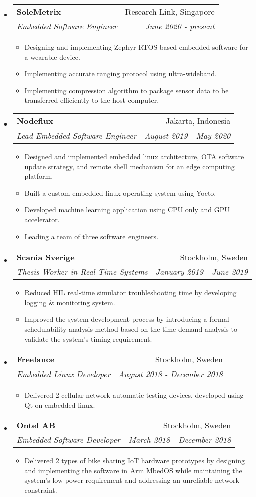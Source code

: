 \documentclass[letterpaper,9pt]{article}
\makeatletter
\newcommand{\resitem}[1]{\item #1 \vspace{-2pt}}
\newcommand{\ressubheading}[4]{
\begin{tabular*}{7.0in}{l@{\cftdotfill{\cftsecdotsep}\extracolsep{\fill}}r}
		\textbf{#1} & #2 \\
        \textit{#3} & \textit{#4} \\
\end{tabular*}\vspace{-6.3pt}}
\makeatother
\begin{document}
\begin{itemize}
  
  \item
        \ressubheading{SoleMetrix}{Research Link, Singapore}{Embedded Software Engineer}{June 2020 - present}
        \begin{itemize}
          \resitem{Designing and implementing Zephyr RTOS-based embedded software for a wearable device.}
          \resitem{Implementing accurate ranging protocol using ultra-wideband.}
          \resitem{Implementing compression algorithm to package sensor data to be transferred efficiently to the host computer.}
        \end{itemize}

  \item
        \ressubheading{Nodeflux}{Jakarta, Indonesia}{Lead Embedded Software Engineer}{August 2019 - May 2020}
        \begin{itemize}
          \resitem{Designed and implemented embedded linux architecture, OTA software update strategy, and remote shell mechanism for an edge computing platform.}
          \resitem{Built a custom embedded linux operating system using Yocto.}
          \resitem{Developed machine learning application using CPU only and GPU accelerator.}
          \resitem{Leading a team of three software engineers.}
        \end{itemize}

  \item
        \ressubheading{Scania Sverige}{Stockholm, Sweden}{Thesis Worker in Real-Time Systems}{January 2019 - June 2019}
        \begin{itemize}
          \resitem{Reduced HIL real-time simulator troubleshooting time by developing logging \& monitoring system.}
          \resitem{Improved the system development process by introducing a formal schedulability analysis method based on the time demand analysis to validate the system's timing requirement.}
        \end{itemize}

  \item
        \ressubheading{Freelance}{Stockholm, Sweden}{Embedded Linux Developer}{August 2018 - December 2018}
        \begin{itemize}
          \resitem{Delivered 2 cellular network automatic testing devices, developed using Qt on embedded linux.}
        \end{itemize}

  \item
        \ressubheading{Ontel AB}{Stockholm, Sweden}{Embedded Software Developer}{March 2018 - December 2018}
        \begin{itemize}
          \resitem{Delivered 2 types of bike sharing IoT hardware prototypes by designing and implementing the software in Arm MbedOS while maintaining the system's low-power requirement and addressing an unreliable network constraint.}
        \end{itemize}


\end{itemize}
\end{document}
